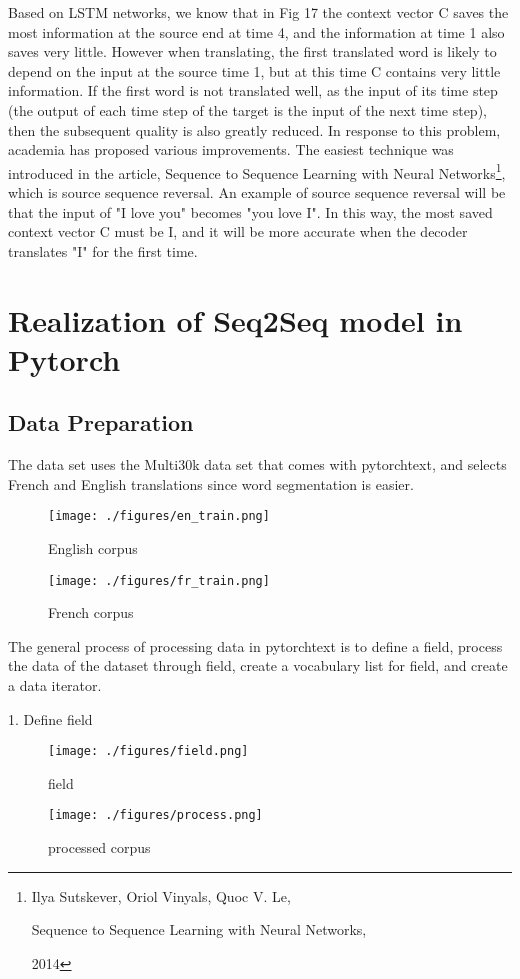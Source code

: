 Based on LSTM networks, we know that in Fig 17 the context vector C saves the most information at the source end at time 4, and the information at time 1 also saves very little. However when translating, the first translated word is likely to depend on the input at the source time 1, but at this time C contains very little information. If the first word is not translated well, as the input of its time step (the output of each time step of the target is the input of the next time step), then the subsequent quality is also greatly reduced.
In response to this problem, academia has proposed various improvements. The easiest technique was introduced in the article, Sequence to Sequence Learning with Neural Networks\footnote{Ilya Sutskever, Oriol Vinyals, Quoc V. Le, 
\begin{itshape}Sequence to Sequence Learning with Neural Networks,
\end{itshape} 2014}, which is source sequence reversal. An example of source sequence reversal will be that the input of "I love you" becomes "you love I". In this way, the most saved context vector C must be I, and it will be more accurate when the decoder translates "I" for the first time.
\section{Realization of Seq2Seq model in Pytorch}
\subsection{Data Preparation}
The data set uses the Multi30k data set that comes with pytorchtext, and selects French and English translations since word segmentation is easier. 

\begin{figure}[h]
	\centering
	\texttt{[image: ./figures/en\_train.png]}
	
	\caption{English corpus}
\end{figure}

\begin{figure}[h]
	\centering
	\texttt{[image: ./figures/fr\_train.png]}
	
	\caption{French corpus}
\end{figure}
The general process of processing data in pytorchtext is to define a field, process the data of the dataset through field, create a vocabulary list for field, and create a data iterator.

1. Define field
\begin{figure}[h]
	\centering
	\texttt{[image: ./figures/field.png]}
	
	\caption{field}
\end{figure}
\begin{figure}[h]
	\centering
	\texttt{[image: ./figures/process.png]}
	
	\caption{processed corpus}
\end{figure}

